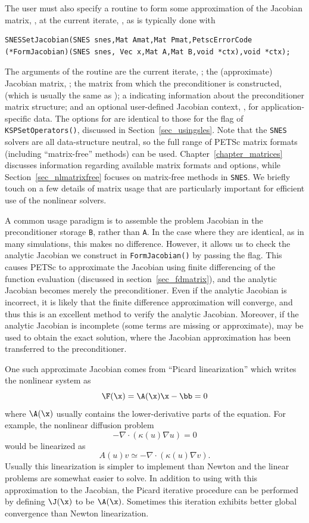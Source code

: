 The user must also specify a routine to form some approximation of the
Jacobian matrix, , at the current iterate, ,
as is typically done with
\begin{lstlisting}
SNESSetJacobian(SNES snes,Mat Amat,Mat Pmat,PetscErrorCode (*FormJacobian)(SNES snes, Vec x,Mat A,Mat B,void *ctx),void *ctx);
\end{lstlisting}
The arguments of the routine  are the current iterate, ; the (approximate) Jacobian matrix,
; the matrix from which the preconditioner is constructed,  (which is usually the same
as ); a  indicating information about the
preconditioner matrix structure; and an optional user-defined Jacobian
context, , for application-specific data.  The options for
 are identical to those for the flag of \lstinline{KSPSetOperators()}, discussed in Section~\ref{sec_usingsles}.
Note that the \lstinline{SNES} solvers are all data-structure neutral, so the full
range of PETSc matrix formats (including ``matrix-free''
methods) can be used.  Chapter~\ref{chapter_matrices} discusses
information regarding available matrix formats and options, while
Section~\ref{sec_nlmatrixfree} focuses on matrix-free
methods in \lstinline{SNES}. We briefly touch on a few details of matrix usage that are
particularly important for efficient use of the nonlinear solvers.

A common usage paradigm is to assemble the problem Jacobian in the
preconditioner storage \lstinline{B}, rather than \lstinline{A}. In the case where they are
identical, as in many simulations, this makes no difference. However, it allows
us to check the analytic Jacobian we construct in \lstinline{FormJacobian()} by
passing the  flag. This causes PETSc to approximate the
Jacobian using finite differencing of the function evaluation (discussed in
section~\ref{sec_fdmatrix}), and the analytic Jacobian becomes merely the
preconditioner. Even if the analytic Jacobian is incorrect, it is likely that
the finite difference approximation will converge, and thus this is an excellent
method to verify the analytic Jacobian. Moreover, if the analytic Jacobian is
incomplete (some terms are missing or approximate),  may
be used to obtain the exact solution, where the Jacobian approximation has been
transferred to the preconditioner.

One such approximate Jacobian comes from ``Picard linearization'' which writes the nonlinear system as
\[ \F(\x) = \A(\x) \x - \bb = 0 \]
where $\A(\x)$ usually contains the lower-derivative parts of the equation.
For example, the nonlinear diffusion problem
\[ - \nabla\cdot(\kappa(u) \nabla u) = 0 \]
would be linearized as
\[ A(u) v \simeq -\nabla\cdot(\kappa(u) \nabla v). \]
Usually this linearization is simpler to implement than Newton and the linear problems are somewhat easier to solve.
In addition to using  with this approximation to the Jacobian, the Picard iterative procedure can be performed by defining
$\J(\x)$ to be $\A(\x)$.
Sometimes this iteration exhibits better global convergence than Newton linearization.

